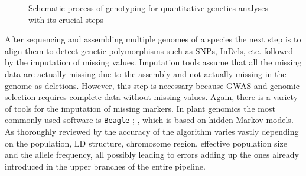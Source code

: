 \begin{figure}[H]
  \begin{center}
    \caption[Schematic process of genotyping for quantitative genetics]{Schematic process of genotyping for quantitative genetics analyses with its crucial steps} \label{fig:quan_flow}
  \end{center}     
\end{figure}

After sequencing and assembling multiple genomes of a species the next step is to align
them to detect genetic polymorphisms such as SNPs, InDels, etc. followed by the imputation
of missing values. Imputation tools assume that all the missing data are actually missing
due to the assembly and not actually missing in the genome as deletions. However, this
step is necessary because GWAS and genomic selection requires complete data without
missing values. Again, there is a variety of tools for the imputation of missing
markers. In plant genomics the most commonly used software is \texttt{Beagle}
\cite{browning2007rapid}; \cite{browning2018one}, which is based on hidden Markov models.
As thoroughly reviewed by \cite{pook2019improving} the accuracy of the algorithm varies
vastly depending on the population, LD structure, chromosome region, effective population
size and the allele frequency, all possibly leading to errors adding up the ones already
introduced in the upper branches of the entire pipeline.

